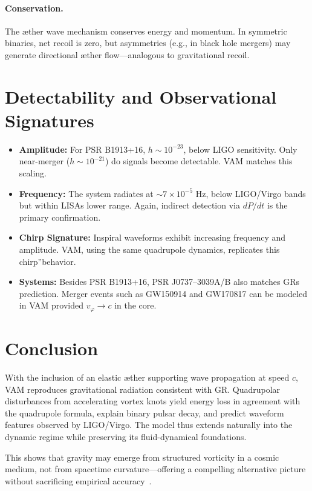 \paragraph{Conservation.}
The æther wave mechanism conserves energy and momentum. In symmetric binaries, net recoil is zero, but asymmetries (e.g., in black hole mergers) may generate directional æther flow—analogous to gravitational recoil.

\section*{Detectability and Observational Signatures}

\begin{itemize}
\item \textbf{Amplitude:} For PSR B1913+16, $h \sim 10^{-23}$, below LIGO sensitivity. Only near-merger ($h \sim 10^{-21}$) do signals become detectable. VAM matches this scaling.
\item \textbf{Frequency:} The system radiates at $\sim 7 \times 10^{-5}$ Hz, below LIGO/Virgo bands but within LISA\rqs s lower range. Again, indirect detection via $dP/dt$ is the primary confirmation.
\item \textbf{Chirp Signature:} Inspiral waveforms exhibit increasing frequency and amplitude. VAM, using the same quadrupole dynamics, replicates this \grqq chirp\textquotedblright behavior.
\item \textbf{Systems:} Besides PSR B1913+16, PSR J0737–3039A/B also matches GR\rqs s prediction. Merger events such as GW150914 and GW170817 can be modeled in VAM provided $v_\varphi \rightarrow c$ in the core.
\end{itemize}

\section*{Conclusion}

With the inclusion of an elastic æther supporting wave propagation at speed $c$, VAM reproduces gravitational radiation consistent with GR. Quadrupolar disturbances from accelerating vortex knots yield energy loss in agreement with the quadrupole formula, explain binary pulsar decay, and predict waveform features observed by LIGO/Virgo. The model thus extends naturally into the dynamic regime while preserving its fluid-dynamical foundations.

This shows that gravity may emerge from structured vorticity in a cosmic medium, not from spacetime curvature—offering a compelling alternative picture without sacrificing empirical accuracy~\cite{iskandarani2025VAM3}.
